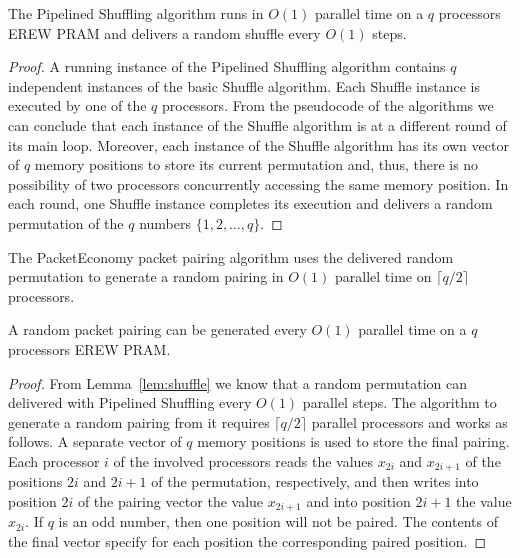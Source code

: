 \documentclass[letterpaper,10pt]{llncs}
\newcommand{\hla}[1]{\hl{#1}}
\renewcommand{\hla}[1]{#1}
\begin{document}
\begin{lemma}
\label{lem:shuffle}
The Pipelined Shuffling algorithm runs in $O(1)$ parallel time on a $q$ processors EREW PRAM
and delivers a random shuffle every $O(1)$ steps.
\end{lemma}

\begin{proof}
\hla{A running instance of the Pipelined Shuffling algorithm contains $q$ independent instances
of the basic Shuffle algorithm. 
Each Shuffle instance is executed by one of the $q$ processors.
From the pseudocode of the algorithms we can conclude that
each instance of the Shuffle algorithm is at a different round of its main loop.
Moreover, each instance of the Shuffle 
algorithm has its own vector of $q$ memory positions
to store its current permutation and, thus, there is no possibility of two processors 
concurrently accessing the same memory position. In each round, one Shuffle instance completes its execution and delivers a random permutation of the $q$ numbers $\{1, 2, \dots, q \}$.}
\end{proof}

\noindent
The PacketEconomy packet pairing algorithm uses the delivered random permutation 
to generate a random pairing in $O(1)$ parallel time on $\lceil q/2 \rceil$ processors.

\begin{theorem}
\label{the:pairing}
A random packet pairing can be generated every $O(1)$ parallel time on a $q$ processors EREW PRAM.
\end{theorem}

\begin{proof}
\hla{
From Lemma~\ref{lem:shuffle} we know that a random permutation can delivered 
with Pipelined Shuffling every $O(1)$ parallel steps.
The algorithm to generate a random pairing from it
requires $\lceil q/2 \rceil$ parallel processors and works as follows.
A separate vector of $q$ memory positions is used to store the final pairing.
Each processor $i$ of the involved processors reads the values $x_{2i}$ and $x_{2i+1}$
of the positions $2i$ and $2i+1$ of the permutation, respectively, and then writes into position 
$2i$ of the pairing vector the value $x_{2i+1}$ and into position 
$2i+1$ the value $x_{2i}$. If $q$ is an odd number, then one position will not be paired. 
The contents of the final vector specify for each position the corresponding paired position.}
\end{proof}
\end{document}

